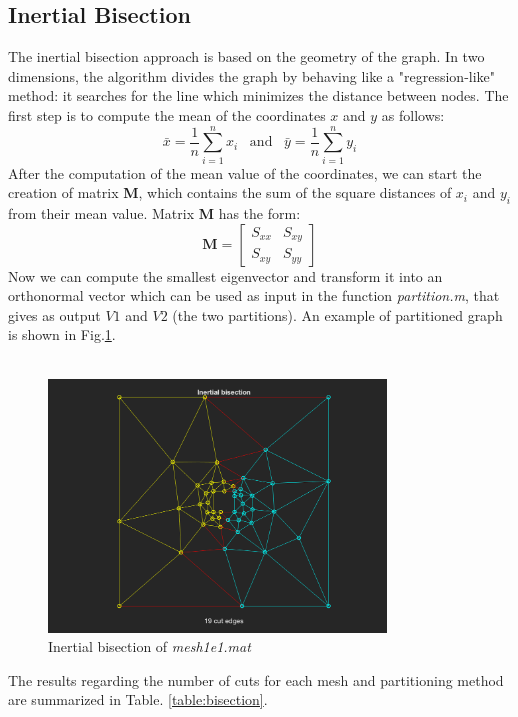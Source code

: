 \documentclass[unicode,11pt,a4paper,oneside,numbers=endperiod,openany]{scrartcl}
\begin{document}
\subsection{Inertial Bisection}
The inertial bisection approach is based on the geometry of the graph. In two dimensions, the algorithm divides the graph by behaving like a "regression-like" method: it searches for the line which minimizes the distance between nodes. 
The first step is to compute the mean of the coordinates $x$ and $y$ as follows:
\begin{equation*}
	\bar x = \frac{1}{n} \sum_{i=1}^n x_i \;\;\; \text{and} \;\;\; \bar y = \frac{1}{n} \sum_{i=1}^n y_i
\end{equation*}
After the computation of the mean value of the coordinates, we can start the creation of matrix \textbf{M}, which contains the sum of the square distances of $x_i$ and $y_i$ from their mean value. Matrix \textbf{M} has the form:
\begin{equation*}
	\boldsymbol{M} = \begin{bmatrix}
		S_{xx} & S_{xy} \\
		S_{xy} & S_{yy}
	\end{bmatrix}
\end{equation*}
Now we can compute the smallest eigenvector and transform it into an orthonormal vector which can be used as input in the function \textit{partition.m}, that gives as output $V1$ and $V2$ (the two partitions). 
An example of partitioned graph is shown in Fig.\ref{fig:inert1e1}.\\\\
\begin{figure}[h!]
	\centering
	\includegraphics[width=0.8\textwidth]{images/inertial_mesh1e1.png}
	\caption{Inertial bisection of \textit{mesh1e1.mat}}	
	\label{fig:inert1e1}
\end{figure}
The results regarding the number of cuts for each mesh and partitioning method are summarized in Table. \ref{table:bisection}.  
\end{document}
